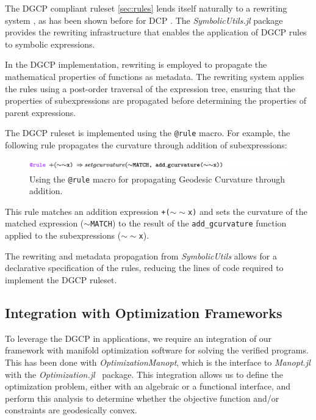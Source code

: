 \documentclass[twoside,11pt]{article}
\begin{document}
The DGCP compliant ruleset \ref{sec:rules} lends itself naturally to a rewriting system \citep{dershowitz1990rewrite}, as has been shown before for DCP \citep{agrawal2018rewriting}. The \textsl{SymbolicUtils.jl} package provides the rewriting infrastructure that enables the application of DGCP rules to symbolic expressions.

In the DGCP implementation, rewriting is employed to propagate the mathematical properties of functions as metadata. The rewriting system applies the rules using a post-order traversal of the expression tree, ensuring that the properties of subexpressions are propagated before determining the properties of parent expressions.

The DGCP ruleset is implemented using the \texttt{@rule} macro. For example, the following rule propagates the curvature through addition of subexpressions:


\begin{figure}
    \centering
    \includegraphics[width=\linewidth]{listing/3.png}
    \caption{Using the \texttt{@rule} macro for propagating Geodesic Curvature through addition.}
    \label{rulecurv}
\end{figure}

This rule matches an addition expression \texttt{+($\sim\sim$x)} and sets the curvature of the matched expression (\texttt{$\sim$MATCH}) to the result of the \texttt{add\_gcurvature} function applied to the subexpressions (\texttt{$\sim\sim$x}).

The rewriting and metadata propagation from \textsl{SymbolicUtils} allows for a declarative specification of the rules, reducing the lines of code required to implement the DGCP ruleset.

\subsection{Integration with Optimization Frameworks}

To leverage the DGCP in applications, we require an integration of our framework with manifold optimization software for solving the verified programs. This has been done with \textsl{OptimizationManopt}, which is the interface to \textsl{Manopt.jl} with the \textsl{Optimization.jl}~\citep{vaibhav_kumar_dixit_2023_7738525} package. This integration allows us to define the optimization problem, either with an algebraic or a functional interface, and perform this analysis to determine whether the objective function and/or constraints are geodesically convex.
\end{document}
